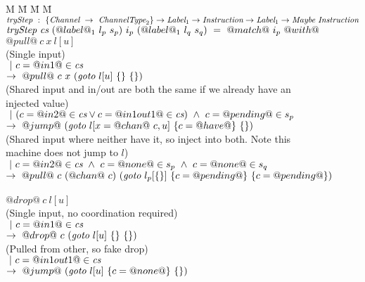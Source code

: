 \newcommand\note[1]{\textcolor{notec}{(#1)}}

\begin{figure}

\newcommand\goto[3]{\ti{goto}~#1~#2~#3}

\begin{tabbing}
M \= M \= M \= M \kill
$\textit{tryStep} ~:~ \{\textit{Channel} ~\to~ \textit{ChannelType}_2\} \to \textit{Label}_1 \to \textit{Instruction} \to \textit{Label}_1 \to \textit{Maybe}~\textit{Instruction}$ \\
$\textit{tryStep} ~\textit{cs}~(@label@_1~l_p~s_p)~i_p~(@label@_1~l_q~s_q)~=~@match@~i_p~@with@$ \\

\> $@pull@~c~x~l[u]$ \\
\> \> \note{Single input}\\
\> \> $~|~c=@in1@\in\textit{cs}$ \\
\> \> $\to~@pull@~c~x~(\goto{l[u]}{\sgl{}}{\sgl{}}) $ \\

\> \> \note{Shared input and in/out are both the same if we already have an injected value}\\
\> \> $~|~(c=@in2@\in\textit{cs} \vee c=@in1out1@\in\textit{cs}) ~\wedge~ c=@pending@ \in s_p$ \\
\> \> $\to~@jump@~(\goto{l[x=@chan@~c,u]}{\sgl{c=@have@}}{\sgl{}}) $ \\

\> \> \note{Shared input where neither have it, so inject into both. Note this machine does not jump to $l$}\\
\> \> $~|~c=@in2@\in\textit{cs} ~\wedge~ c=@none@ \in s_p ~\wedge~ c=@none@ \in s_q$ \\
\> \> $\to~@pull@~c~(@chan@~c)~(\goto{l_p[\sgl{}]}{\sgl{c=@pending@}}{\sgl{c=@pending@}}) $ \\
\\

\> $@drop@~c~l[u]$ \\
\> \> \note{Single input, no coordination required} \\
\> \> $~|~c=@in1@\in\textit{cs}$ \\
\> \> $\to~@drop@~c~(\goto{l[u]}{\sgl{}}{\sgl{}}) $ \\

\> \> \note{Pulled from other, so fake drop}\\
\> \> $~|~c=@in1out1@\in\textit{cs}$ \\
\> \> $\to~@jump@~(\goto{l[u]}{\sgl{c=@none@}}{\sgl{}}) $ \\


\end{tabbing}
\end{figure}
